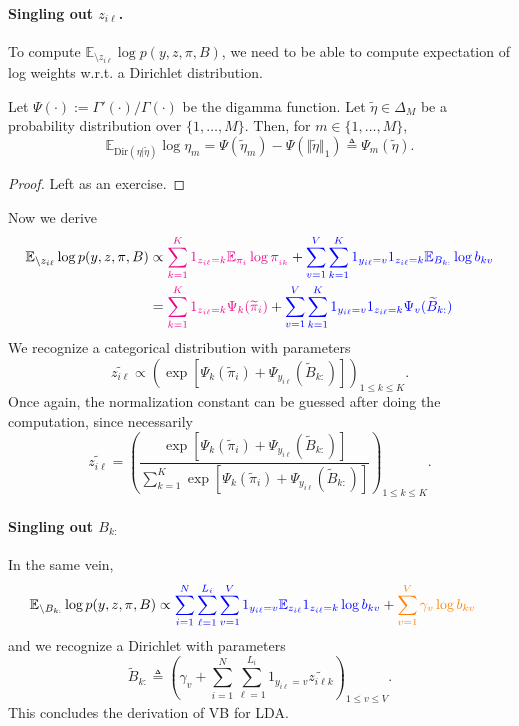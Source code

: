\paragraph{Singling out $z_{i\ell}$.}
To compute $\mathbb{E}_{\setminus z_{i\ell}} \log p(y,z,\pi, B)$, we need to be able to compute expectation of log weights w.r.t. a Dirichlet distribution.
\begin{lemma}
Let $\Psi(\cdot) := \Gamma'(\cdot)/\Gamma(\cdot)$ be the digamma function.
Let $\widetilde\eta\in \Delta_M$ be a probability distribution over $\{1,\dots, M\}$.
Then, for $m\in \{1,\dots, M\}$,
$$
  \mathbb{E}_{\text{Dir}(\eta\vert\widetilde\eta)} \log \eta_m = \Psi(\widetilde\eta_m) - \Psi(\Vert \widetilde\eta\Vert_1) \triangleq \Psi_m(\widetilde{\eta}).
$$
\end{lemma}
\begin{proof}
  Left as an exercise.
\end{proof}

Now we derive
\begin{align*}
  \mathbb{E}_{\setminus z_{i\ell}} \log p(y,z,\pi, B)
    &\propto  \textcolor{magenta}{\sum_{k=1}^K  1_{z_{i\ell}=k} \mathbb{E}_{\pi_i}\log\pi_{_{ik}}}
    + \textcolor{blue}{\sum_{v=1}^V \sum_{k=1}^K 1_{y_{i\ell}=v} 1_{z_{i\ell}=k} \mathbb{E}_{B_{k:}}\log b_{kv} }\\
    &=  \textcolor{magenta}{\sum_{k=1}^K  1_{z_{i\ell}=k} \Psi_k(\widetilde\pi_{i})}
    + \textcolor{blue}{\sum_{v=1}^V \sum_{k=1}^K 1_{y_{i\ell}=v} 1_{z_{i\ell}=k} \Psi_v(\widetilde{B}_{k:}) }
\end{align*}
We recognize a categorical distribution with parameters
$$
\widetilde{z_{i\ell}} \propto \left( \exp\left[\Psi_k(\widetilde\pi_{i}) +  \Psi_{y_{i\ell}}(\widetilde{B}_{k:})\right]\right)_{1\leq k \leq K}.
$$
Once again, the normalization constant can be guessed after doing the computation, since necessarily
$$
  \widetilde{z_{i\ell}} =
    \left(
      \frac{\exp\left[\Psi_k(\widetilde\pi_{i}) +  \Psi_{y_{i\ell}}(\widetilde{B}_{k:})\right]}
      {\sum_{k=1}^K \exp\left[\Psi_k(\widetilde\pi_{i}) +  \Psi_{y_{i\ell}}(\widetilde{B}_{k:})\right]}
    \right)_{1\leq k \leq K}.
$$

\paragraph{Singling out $B_{k:}$}
In the same vein,
\begin{align*}
  \mathbb{E}_{\setminus B_{k:}} \log p(y,z,\pi, B)
    &\propto \textcolor{blue}{\sum_{i=1}^N\sum_{\ell=1}^{L_i}\sum_{v=1}^V 1_{y_{i\ell}=v} \mathbb{E}_{z_{i\ell}} 1_{z_{i\ell}=k} \log b_{kv} } + \textcolor{orange}{\sum_{v=1}^V \gamma_v\log b_{kv}}
\end{align*}
and we recognize a Dirichlet with parameters
$$
\widetilde{B}_{k:} \triangleq \left (\gamma_v + \sum_{i=1}^N\sum_{\ell=1}^{L_i} 1_{y_{i\ell}=v}\widetilde{z_{i\ell k}} \right)_{1\leq v \leq V}.
$$
This concludes the derivation of VB for LDA.

